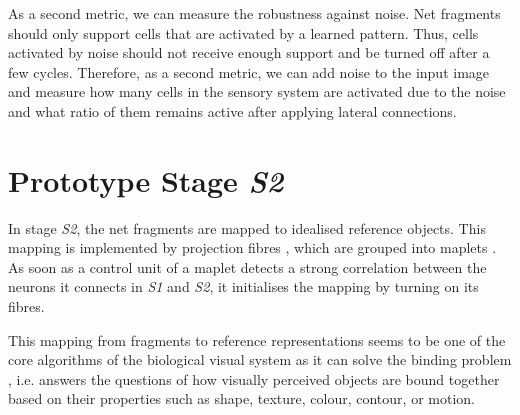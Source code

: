 As a second metric, we can measure the robustness against noise.
Net fragments should only support cells that are activated by a learned pattern. Thus, cells activated by noise should not receive enough support and be turned off after a few cycles.
Therefore, as a second metric, we can add noise to the input image and measure how many cells in the sensory system are activated due to the noise and what ratio of them remains active after applying lateral connections.


\section{Prototype Stage \emph{S2}}
In stage \emph{S2}, the net fragments are mapped to idealised reference objects.
This mapping is implemented by projection fibres \cite{tanigawa_organization_2005, greig_molecular_2013}, which are grouped into maplets .
As soon as a control unit of a maplet detects a strong correlation between the neurons it connects in \emph{S1} and \emph{S2}, it initialises the mapping by turning on its fibres.

This mapping from fragments to reference representations seems to be one of the core algorithms of the biological visual system as it can solve the binding problem , i.e. answers the questions of how visually perceived objects are bound together based on their properties such as shape, texture, colour, contour, or motion.

